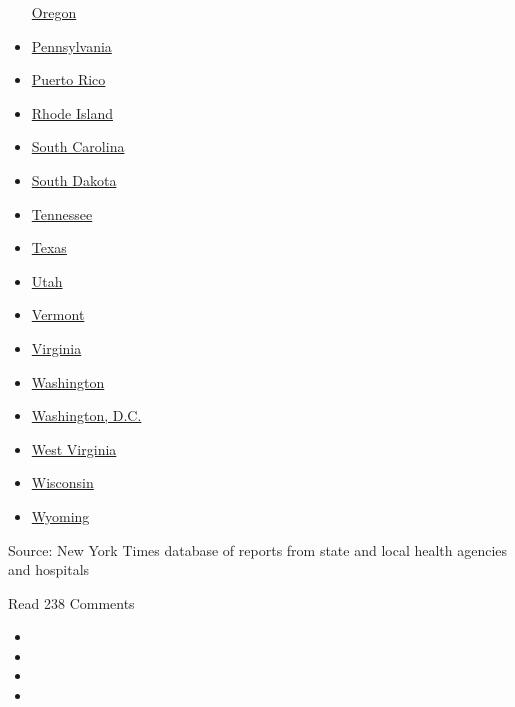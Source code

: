 \begin{itemize}
  \href{https://www.nytimes.com/interactive/2020/us/oregon-coronavirus-cases.html}{Oregon}
\item
  \href{https://www.nytimes.com/interactive/2020/us/pennsylvania-coronavirus-cases.html}{Pennsylvania}
\item
  \href{https://www.nytimes.com/interactive/2020/us/puerto-rico-coronavirus-cases.html}{Puerto
  Rico}
\item
  \href{https://www.nytimes.com/interactive/2020/us/rhode-island-coronavirus-cases.html}{Rhode
  Island}
\item
  \href{https://www.nytimes.com/interactive/2020/us/south-carolina-coronavirus-cases.html}{South
  Carolina}
\item
  \href{https://www.nytimes.com/interactive/2020/us/south-dakota-coronavirus-cases.html}{South
  Dakota}
\item
  \href{https://www.nytimes.com/interactive/2020/us/tennessee-coronavirus-cases.html}{Tennessee}
\item
  \href{https://www.nytimes.com/interactive/2020/us/texas-coronavirus-cases.html}{Texas}
\item
  \href{https://www.nytimes.com/interactive/2020/us/utah-coronavirus-cases.html}{Utah}
\item
  \href{https://www.nytimes.com/interactive/2020/us/vermont-coronavirus-cases.html}{Vermont}
\item
  \href{https://www.nytimes.com/interactive/2020/us/virginia-coronavirus-cases.html}{Virginia}
\item
  \href{https://www.nytimes.com/interactive/2020/us/washington-coronavirus-cases.html}{Washington}
\item
  \href{https://www.nytimes.com/interactive/2020/us/washington-dc-coronavirus-cases.html}{Washington,
  D.C.}
\item
  \href{https://www.nytimes.com/interactive/2020/us/west-virginia-coronavirus-cases.html}{West
  Virginia}
\item
  \href{https://www.nytimes.com/interactive/2020/us/wisconsin-coronavirus-cases.html}{Wisconsin}
\item
  \href{https://www.nytimes.com/interactive/2020/us/wyoming-coronavirus-cases.html}{Wyoming}
\end{itemize}

Source: New York Times database of reports from state and local health
agencies and hospitals

Read 238 Comments

\begin{itemize}
\item
\item
\item
\item
\end{itemize}

